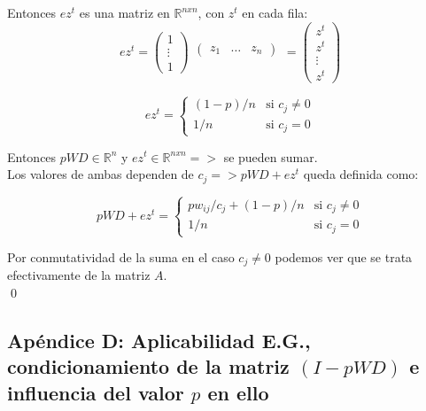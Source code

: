 		Entonces $e z^{t}$ es una matriz en $\mathbb{R}^{nxn}$, con $z^{t}$ en cada fila: \\

		\[
		        e z^{t} 	= 	\begin{pmatrix}
							1 \\
							\vdots \\
							1
						\end  {pmatrix}
						\begin{matrix}
							\begin{pmatrix}z_1 & \hdots & z_n
							\end  {pmatrix}\\\mbox{}
						\end{matrix}
					= 	\begin{pmatrix}
							z^t 	\\
							z^t 	\\
							\vdots 	\\
							z^t
						\end  {pmatrix}
		\]

		\[
			        ez^{t} = \begin{cases}
						(1-p)/n & \text{si } c_{j} \neq 0 \\
						 1   /n & \text{si } c_{j}   =  0
					 \end  {cases}
		\]

		Entonces $pWD \in \mathbb{R}^{n}$ y $ez^{t} \in \mathbb{R}^{nxn} =>$ se pueden sumar. \\

		Los valores de ambas dependen de $c_j => pWD+ez^t$ queda definida como:

		\[
			        pWD+ez^{t} = 	\begin{cases}
							pw_{ij}/c_j+(1-p)/n & \text{si } c_{j} \neq 0 \\
								     1   /n & \text{si } c_{j}   =  0
						\end  {cases}
		\]

		Por conmutatividad de la suma en el caso $c_j \neq 0$ podemos ver que se trata efectivamente de la matriz $A$. \\

		\qed

	\clearpage

	\subsection{Apéndice D: Aplicabilidad E.G., condicionamiento de la matriz $(I-pWD)$ e influencia del valor $p$ en ello}


